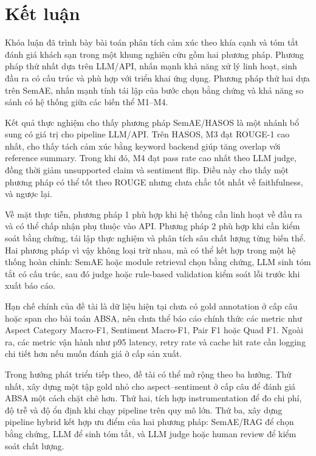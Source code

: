 \chapter{Kết luận}

Khóa luận đã trình bày bài toán phân tích cảm xúc theo khía cạnh và tóm tắt đánh giá khách sạn trong một khung nghiên cứu gồm hai phương pháp. Phương pháp thứ nhất dựa trên LLM/API, nhấn mạnh khả năng xử lý linh hoạt, sinh đầu ra có cấu trúc và phù hợp với triển khai ứng dụng. Phương pháp thứ hai dựa trên SemAE, nhấn mạnh tính tái lập của bước chọn bằng chứng và khả năng so sánh có hệ thống giữa các biến thể M1--M4.

Kết quả thực nghiệm cho thấy phương pháp SemAE/HASOS là một nhánh bổ sung có giá trị cho pipeline LLM/API. Trên HASOS, M3 đạt ROUGE-1 cao nhất, cho thấy tách cảm xúc bằng keyword backend giúp tăng overlap với reference summary. Trong khi đó, M4 đạt pass rate cao nhất theo LLM judge, đồng thời giảm unsupported claim và sentiment flip. Điều này cho thấy một phương pháp có thể tốt theo ROUGE nhưng chưa chắc tốt nhất về faithfulness, và ngược lại.

Về mặt thực tiễn, phương pháp 1 phù hợp khi hệ thống cần linh hoạt về đầu ra và có thể chấp nhận phụ thuộc vào API. Phương pháp 2 phù hợp khi cần kiểm soát bằng chứng, tái lập thực nghiệm và phân tích sâu chất lượng từng biến thể. Hai phương pháp vì vậy không loại trừ nhau, mà có thể kết hợp trong một hệ thống hoàn chỉnh: SemAE hoặc module retrieval chọn bằng chứng, LLM sinh tóm tắt có cấu trúc, sau đó judge hoặc rule-based validation kiểm soát lỗi trước khi xuất báo cáo.

Hạn chế chính của đề tài là dữ liệu hiện tại chưa có gold annotation ở cấp câu hoặc span cho bài toán ABSA, nên chưa thể báo cáo chính thức các metric như Aspect Category Macro-F1, Sentiment Macro-F1, Pair F1 hoặc Quad F1. Ngoài ra, các metric vận hành như p95 latency, retry rate và cache hit rate cần logging chi tiết hơn nếu muốn đánh giá ở cấp sản xuất.

Trong hướng phát triển tiếp theo, đề tài có thể mở rộng theo ba hướng. Thứ nhất, xây dựng một tập gold nhỏ cho aspect--sentiment ở cấp câu để đánh giá ABSA một cách chặt chẽ hơn. Thứ hai, tích hợp instrumentation để đo chi phí, độ trễ và độ ổn định khi chạy pipeline trên quy mô lớn. Thứ ba, xây dựng pipeline hybrid kết hợp ưu điểm của hai phương pháp: SemAE/RAG để chọn bằng chứng, LLM để sinh tóm tắt, và LLM judge hoặc human review để kiểm soát chất lượng.
